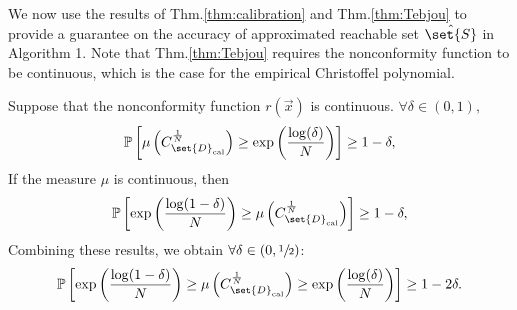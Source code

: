 \documentclass[pmlr]{jmlr}%
\begin{document}
%   
%
We now use the results of Thm.\;\ref{thm:calibration} and Thm.\;\ref{thm:Tebjou}
to provide a guarantee on the accuracy of approximated reachable set $\hat{\set{S}}$ in Algorithm 1. Note that  Thm.\;\ref{thm:Tebjou} requires the nonconformity function to be continuous, which is the case for the empirical Christoffel polynomial.
%
\begin{theorem}\label{thm:calibrated_sublevels}
Suppose that the nonconformity function $r(\Vec{x})$ is continuous. $\forall \delta \in (0,1),$
\begin{equation}\label{eq:final1}
\mathbb{P}\left[  \mu \left(   C_{\set{D}_\mathrm{cal}}^{\frac{1}{N}} \right) \geq  \exp \left(\frac{ \log (\delta)}{N}\right) \right] \geq 1-\delta,
\end{equation}
If the measure $\mu$ is continuous, then
\begin{equation}\label{eq:final2}
\mathbb{P}\left[  \exp \left(\frac{ \log ( 1 - \delta)}{N}\right)  \geq \mu \left(   C_{\set{D}_\mathrm{cal}}^{\frac{1}{N}}   \right)  \right] \geq 1-\delta  ,
\end{equation}
Combining these results, we obtain $\forall \delta \in (0,\sfrac{1}{2})$:
\begin{equation}\label{eq:final3}
    \mathbb{P}\left[  \exp \left(\frac{ \log ( 1 - \delta)}{N}\right)  \geq \mu \left(   C_{\set{D}_\mathrm{cal}}^{\frac{1}{N}}   \right) \geq  \exp \left(\frac{ \log (\delta)}{N}\right) \right] \geq 1-2\delta. 
\end{equation}

\end{theorem}
\end{document}
